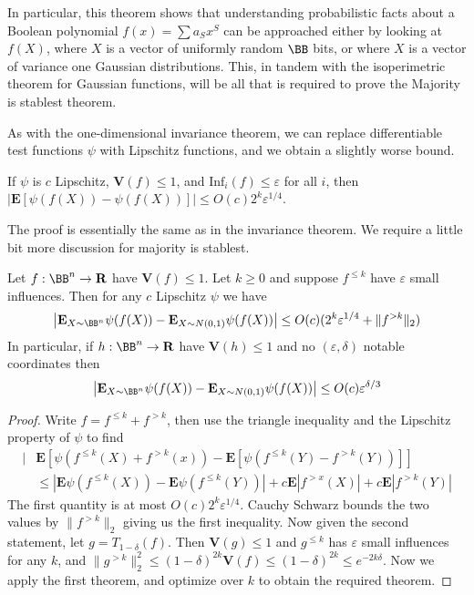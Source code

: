 In particular, this theorem shows that understanding probabilistic facts about a Boolean polynomial $f(x) = \sum a_S x^S$ can be approached either by looking at $f(X)$, where $X$ is a vector of uniformly random $\BB$ bits, or where $X$ is a vector of variance one Gaussian distributions. This, in tandem with the isoperimetric theorem for Gaussian functions, will be all that is required to prove the Majority is stablest theorem.

As with the one-dimensional invariance theorem, we can replace differentiable test functions $\psi$ with Lipschitz functions, and we obtain a slightly worse bound.

\begin{theorem}
    If $\psi$ is $c$ Lipschitz, $\mathbf{V}(f) \leq 1$, and $\text{Inf}_i(f) \leq \varepsilon$ for all $i$, then $|\mathbf{E}[\psi(f(X)) - \psi(f(X))]| \leq O(c) 2^k \varepsilon^{1/4}$.
\end{theorem}

The proof is essentially the same as in the invariance theorem. We require a little bit more discussion  for majority is stablest.

\begin{theorem}
    Let $f: \BB^n \to \mathbf{R}$ have $\mathbf{V}(f) \leq 1$. Let $k \geq 0$ and suppose $f^{\leq k}$ have $\varepsilon$ small influences. Then for any $c$ Lipschitz $\psi$ we have
    \[ \left| \mathbf{E}_{X \sim \BB^n} \psi(f(X)) - \mathbf{E}_{X \sim N(0,1)} \psi(f(X)) \right| \leq O(c)(2^k \varepsilon^{1/4} + \| f^{> k} \|_2) \]
    In particular, if $h: \BB^n \to \mathbf{R}$ have $\mathbf{V}(h) \leq 1$ and no $(\varepsilon, \delta)$ notable coordinates then
    \[ \left| \mathbf{E}_{X \sim \BB^n} \psi(f(X)) - \mathbf{E}_{X \sim N(0,1)} \psi(f(X)) \right| \leq O(c) \varepsilon^{\delta/3} \]
\end{theorem}
\begin{proof}
    Write $f = f^{\leq k} + f^{> k}$, then use the triangle inequality and the Lipschitz property of $\psi$ to find
    \begin{align*}
        |&\mathbf{E}[\psi(f^{\leq k}(X) + f^{> k}(x)) - \mathbf{E}[\psi(f^{\leq k}(Y) - f^{> k}(Y))]]\\
        &\leq |\mathbf{E} \psi(f^{\leq k}(X)) - \mathbf{E} \psi(f^{\leq k}(Y))| + c \mathbf{E}|f^{> x}(X)| + c \mathbf{E}|f^{> k}(Y)|
    \end{align*}
    The first quantity is at most $O(c)2^k \varepsilon^{1/4}$. Cauchy Schwarz bounds the two values by $\| f^{> k} \|_2$ giving us the first inequality. Now given the second statement, let $g = T_{1-\delta}(f)$. Then $\mathbf{V}(g) \leq 1$ and $g^{\leq k}$ has $\varepsilon$ small influences for any $k$, and $\| g^{> k} \|_2^2 \leq (1 - \delta)^{2k} \mathbf{V}(f) \leq (1 - \delta)^{2k} \leq e^{-2k\delta}$. Now we apply the first theorem, and optimize over $k$ to obtain the required theorem.
\end{proof}

